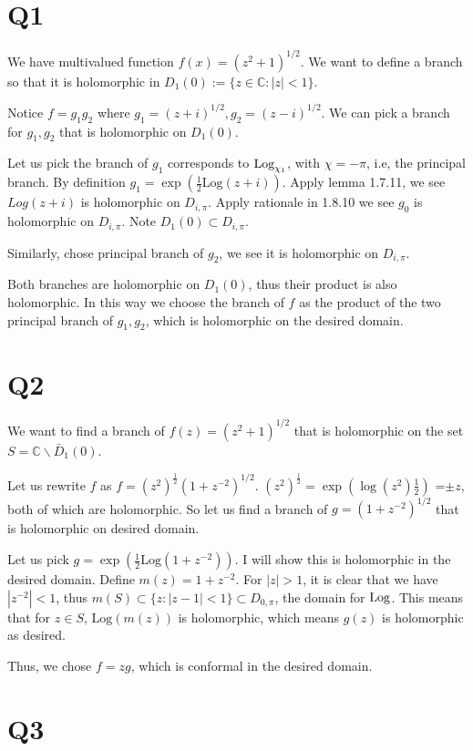 \documentclass[12pt, a4paper]{article}
\theoremstyle{definition}
\theoremstyle{remark}
\newcommand{\bb}[1]{\mathbb{#1}}
\newcommand{\Log}[1]{\text{Log}#1}
\begin{document}
\section{Q1}

We have multivalued function $f(x) = (z^2 + 1)^{1/2}$. We want to define a branch so that it is holomorphic in $D_1(0) := \{z \in \bb{C} : |z| < 1\}$.

Notice $f = g_1 g_2$ where $g_1 = (z+i)^{1/2}, g_2 = (z-i)^{1/2} $. We can pick a branch for $g_1, g_2$ that is holomorphic on $D_1(0)$.

Let us pick the branch of $g_1$ corresponds to $\Log_{\chi_1}$, with $\chi = -\pi$, i.e, the principal branch.
By definition $g_1 = \exp(\frac{1}{2} \Log(z+i))$.
Apply lemma 1.7.11, we see $Log(z+i)$ is holomorphic on $D_{i, \pi}$.
Apply rationale in 1.8.10 we see $g_0$ is holomorphic on $D_{i, \pi}$. Note $D_1(0) \subset D_{i, \pi}$.

Similarly, chose principal branch of $g_2$, we see it is holomorphic on $D_{i, \pi}$.

Both branches are holomorphic on $D_1(0)$, thus their product is also holomorphic.
In this way we choose the branch of $f$ as the product of the two principal branch of $g_1, g_2$, which is holomorphic on the desired domain.

\section{Q2}

We want to find a branch of $f(z) = (z^2 + 1)^{1/2}$ that is holomorphic on the set $S = \bb{C} \smallsetminus \bar{D}_1(0)$.

Let us rewrite $f$ as $f = (z^2)^{\frac{1}{2}}(1+z^{-2})^{1/2}$. $(z^2)^{\frac{1}{2}} = \exp(\log(z^2) \frac{1}{2})$ =$\pm z$, both of which are holomorphic.
So let us find a branch of $g=(1+z^{-2})^{1/2}$ that is holomorphic on desired domain.

Let us pick $g = \exp(\frac{1}{2}\Log(1+z^{-2}))$. I will show this is holomorphic in the desired domain. Define $m(z)= 1+z^{-2}$. For $|z| > 1$, it is clear that we have $|z^{-2}| < 1$, thus $m(S) \subset \{z : |z-1| < 1\} \subset D_{0, \pi} $, the domain for $\Log$.
This means that for $z \in S$, $\Log(m(z))$ is holomorphic, which means $g(z)$ is holomorphic as desired.

Thus, we chose $f = zg$, which is conformal in the desired domain.

\section{Q3}
\end{document}

